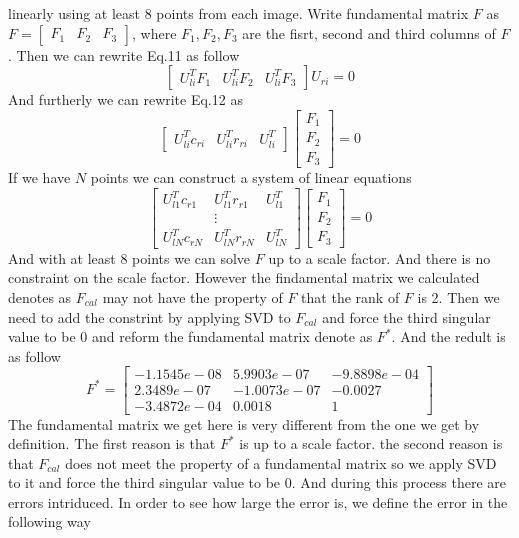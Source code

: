 \documentclass{article}
\begin{document}
linearly using at least 8 points from each image. Write fundamental matrix $F$ as $F=\begin{bmatrix}F_1&F_2&F_3\end{bmatrix}$, where $F_1,F_2,F_3$ are the fisrt, second and third columns of $F$. Then we can rewrite Eq.11 as follow
\begin{equation}
\begin{bmatrix}
U_{li}^TF_1&U_{li}^TF_2&U_{li}^TF_3
\end{bmatrix}U_{ri}=0
\end{equation}
And furtherly we can rewrite Eq.12 as
\begin{equation}
\begin{bmatrix}
U_{li}^Tc_{ri}&U_{li}^Tr_{ri}&U_{li}^T
\end{bmatrix}\begin{bmatrix}F_1\\F_2\\F_3\end{bmatrix}=0
\end{equation}
If we have $N$ points we can construct a system of linear equations
\begin{equation}
\begin{bmatrix}
U_{l1}^Tc_{r1}&U_{l1}^Tr_{r1}&U_{l1}^T\\
 &\vdots& \\
 U_{lN}^Tc_{rN}&U_{lN}^Tr_{rN}&U_{lN}^T
\end{bmatrix}\begin{bmatrix}F_1\\F_2\\F_3\end{bmatrix}=0
\end{equation}
And with at least 8 points we can solve $F$ up to a scale factor. And there is no constraint on the scale factor\cite{ref1}. However the findamental matrix we calculated denotes as $F_{cal}$ may not have the property of $F$ that the rank of $F$ is 2. Then we need to add the constrint by applying SVD to $F_{cal}$ and force the third singular value to be 0 and reform the fundamental matrix denote as $F^*$.\cite{ref2} And the redult is as follow
\begin{equation*}
F^*=\begin{bmatrix}
-1.1545e-08&5.9903e-07&-9.8898e-04\\
2.3489e-07&-1.0073e-07&-0.0027\\
-3.4872e-04&0.0018&1
\end{bmatrix}
\end{equation*}
The fundamental matrix we get here is very different from the one we get by definition. The first reason is that $F^*$ is up to a scale factor. the second reason is that $F_{cal}$ does not meet the property of a fundamental matrix so we apply SVD to it and force the third singular value to be 0. And during this process there are errors intriduced. In order to see how large the error is, we define the error in the following way
\end{document}
